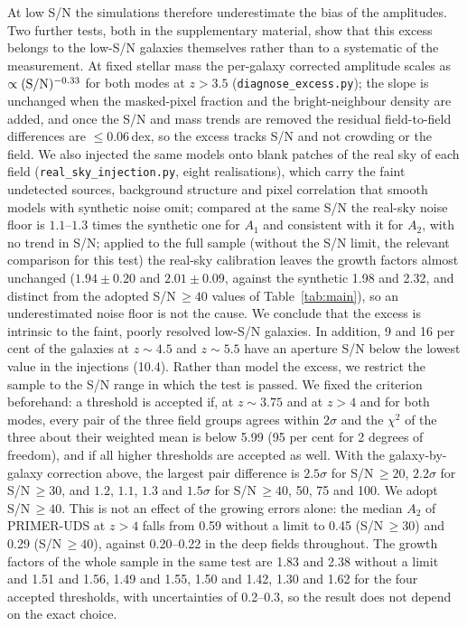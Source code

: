\documentclass[fleqn,usenatbib]{mnras}
\begin{document}
At low S/N the simulations therefore underestimate the bias of the amplitudes.
Two further tests, both in the supplementary material, show that this excess
belongs to the low-S/N galaxies themselves rather than to a systematic of the
measurement. At fixed stellar mass the per-galaxy corrected amplitude scales as
$\propto({\rm S/N})^{-0.33}$ for both modes at $z>3.5$
(\texttt{diagnose\_excess.py}); the slope is unchanged when the masked-pixel
fraction and the bright-neighbour density are added, and once the S/N and mass
trends are removed the residual field-to-field differences are $\leq0.06$\,dex,
so the excess tracks S/N and not crowding or the field. We also injected the same
models onto blank patches of the real sky of each field
(\texttt{real\_sky\_injection.py}, eight realisations), which carry the faint
undetected sources, background structure and pixel correlation that smooth models
with synthetic noise omit; compared at the same S/N the real-sky noise floor is
$1.1$--$1.3$ times the synthetic one for $A_1$ and consistent with it for $A_2$,
with no trend in S/N; applied to the full sample (without the S/N limit, the
relevant comparison for this test) the real-sky calibration leaves the growth
factors almost unchanged ($1.94\pm0.20$ and $2.01\pm0.09$, against the synthetic
1.98 and 2.32, and distinct from the adopted S/N$\,\geq40$ values of
Table~\ref{tab:main}), so an underestimated noise floor is not the cause. We conclude that the excess is intrinsic to the faint, poorly resolved
low-S/N galaxies. In addition, 9 and 16 per cent of the galaxies at
$z\sim4.5$ and $z\sim5.5$ have an aperture S/N below the lowest value in the
injections (10.4). Rather than model the excess, we restrict the sample to the
S/N range in which the test is passed. We fixed the criterion beforehand: a
threshold is accepted if, at $z\sim3.75$ and at $z>4$ and for both modes, every
pair of the three field groups agrees within $2\sigma$ and the $\chi^2$ of the
three about their weighted mean is below 5.99 (95 per cent for 2 degrees of
freedom), and if all higher thresholds are accepted as well. With the
galaxy-by-galaxy correction above, the largest pair difference is $2.5\sigma$
for S/N$\,\geq20$, $2.2\sigma$ for S/N$\,\geq30$, and $1.2$, $1.1$, $1.3$ and
$1.5\sigma$ for S/N$\,\geq40$, 50, 75 and 100. We adopt S/N$\,\geq40$. This is
not an effect of the growing errors alone: the median $A_2$ of PRIMER-UDS at
$z>4$ falls from 0.59 without a limit to 0.45 (S/N$\,\geq30$) and 0.29
(S/N$\,\geq40$), against 0.20--0.22 in the deep fields throughout. The growth
factors of the whole sample in the same test are 1.83 and 2.38 without a limit
and 1.51 and 1.56, 1.49 and 1.55, 1.50 and 1.42, 1.30 and 1.62 for the four
accepted thresholds, with uncertainties of 0.2--0.3, so the result does not
depend on the exact choice.
\end{document}
